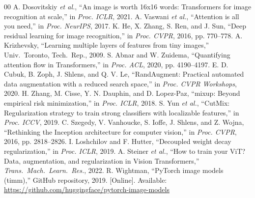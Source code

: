 \documentclass[conference]{IEEEtran}
\begin{document}
\begin{thebibliography}{00}
A. Dosovitskiy \emph{et al.}, ``An image is worth 16x16 words: Transformers for image recognition at scale,'' in \emph{Proc. ICLR}, 2021.
A. Vaswani \emph{et al.}, ``Attention is all you need,'' in \emph{Proc. NeurIPS}, 2017.
K. He, X. Zhang, S. Ren, and J. Sun, ``Deep residual learning for image recognition,'' in \emph{Proc. CVPR}, 2016, pp. 770--778.
A. Krizhevsky, ``Learning multiple layers of features from tiny images,'' Univ.\ Toronto, Tech.\ Rep., 2009.
S. Abnar and W. Zuidema, ``Quantifying attention flow in Transformers,'' in \emph{Proc. ACL}, 2020, pp. 4190--4197.
E. D. Cubuk, B. Zoph, J. Shlens, and Q. V. Le, ``RandAugment: Practical automated data augmentation with a reduced search space,'' in \emph{Proc. CVPR Workshops}, 2020.
H. Zhang, M. Cisse, Y. N. Dauphin, and D. Lopez-Paz, ``mixup: Beyond empirical risk minimization,'' in \emph{Proc. ICLR}, 2018.
S. Yun \emph{et al.}, ``CutMix: Regularization strategy to train strong classifiers with localizable features,'' in \emph{Proc. ICCV}, 2019.
C. Szegedy, V. Vanhoucke, S. Ioffe, J. Shlens, and Z. Wojna, ``Rethinking the Inception architecture for computer vision,'' in \emph{Proc. CVPR}, 2016, pp. 2818--2826.
I. Loshchilov and F. Hutter, ``Decoupled weight decay regularization,'' in \emph{Proc. ICLR}, 2019.
A. Steiner \emph{et al.}, ``How to train your ViT? Data, augmentation, and regularization in Vision Transformers,'' \emph{Trans.\ Mach.\ Learn.\ Res.}, 2022.
R. Wightman, ``PyTorch image models (timm),'' GitHub repository, 2019. [Online]. Available: \url{https://github.com/huggingface/pytorch-image-models}
\end{thebibliography}
\end{document}
